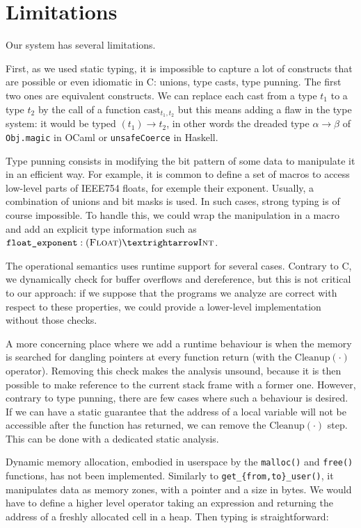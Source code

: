 \section{Limitations}

Our system has several limitations.

First, as we used static typing, it is impossible to capture a lot of constructs
that are possible or even idiomatic in C: unions, type casts, type punning. The
first two ones are equivalent constructs. We can replace each cast from a type
$t_1$ to a type $t_2$ by the call of a function $\mathrm{cast}_{t_1,t_2}$ but
this means adding a flaw in the type system: it would be typed $(t_1) → t_2$,
in other words the dreaded type $α → β$ of \texttt{Obj.magic} in OCaml
or \texttt{unsafeCoerce} in Haskell.

Type punning consists in modifying the bit pattern of some data to manipulate it
in an efficient way. For example, it is common to define a set of macros to
access low-level parts of IEEE754 floats, for exemple their exponent. Usually, a
combination of unions and bit masks is used. In such cases, strong typing is of
course impossible. To handle this, we could wrap the manipulation in a macro and
add an explicit type information such as $\texttt{float\_exponent} : (\tFloat) →
\tInt$.

The operational semantics uses runtime support for several cases. Contrary to C,
we dynamically check for buffer overflows and \eNull dereference, but this is
not critical to our approach: if we suppose that the programs we analyze are
correct with respect to these properties, we could provide a lower-level
implementation without those checks.

A more concerning place where we add a runtime behaviour is when the memory is
searched for dangling pointers at every function return (with the
$\mathrm{Cleanup(\cdot)}$ operator). Removing this check makes the analysis
unsound, because it is then possible to make reference to the current stack
frame with a former one. However, contrary to type punning, there are few cases
where such a behaviour is desired. If we can have a static guarantee that the
address of a local variable will not be accessible after the function has
returned, we can remove the $\mathrm{Cleanup(\cdot)}$ step. This can be done
with a dedicated static analysis\cite{ifm10}.

Dynamic memory allocation, embodied in userspace by the \texttt{malloc()} and
\texttt{free()} functions, has not been implemented. Similarly to
\texttt{get\_\{from,to\}\_user()}, it manipulates data as memory zones, with a
pointer and a size in bytes. We would have to define a higher level operator
taking an expression and returning the address of a freshly allocated cell in a
heap. Then typing is straightforward:

